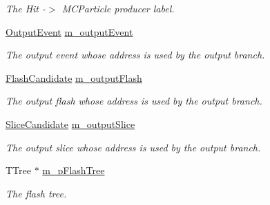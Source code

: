 \begin{DoxyCompactItemize}
\begin{DoxyCompactList}\small\item\em The Hit -\/$>$ M\+C\+Particle producer label. \end{DoxyCompactList}\item 
\hyperlink{classflashmatch_1_1FlashMatchingTool_1_1OutputEvent}{Output\+Event} \hyperlink{classflashmatch_1_1FlashMatchingTool_a17f8d293d8a8a47a3a18782c1975cca5}{m\+\_\+output\+Event}\hypertarget{classflashmatch_1_1FlashMatchingTool_a17f8d293d8a8a47a3a18782c1975cca5}{}\label{classflashmatch_1_1FlashMatchingTool_a17f8d293d8a8a47a3a18782c1975cca5}

\begin{DoxyCompactList}\small\item\em The output event whose address is used by the output branch. \end{DoxyCompactList}\item 
\hyperlink{classflashmatch_1_1FlashMatchingTool_1_1FlashCandidate}{Flash\+Candidate} \hyperlink{classflashmatch_1_1FlashMatchingTool_a5143114bf5396507981d5beb51cd19ff}{m\+\_\+output\+Flash}\hypertarget{classflashmatch_1_1FlashMatchingTool_a5143114bf5396507981d5beb51cd19ff}{}\label{classflashmatch_1_1FlashMatchingTool_a5143114bf5396507981d5beb51cd19ff}

\begin{DoxyCompactList}\small\item\em The output flash whose address is used by the output branch. \end{DoxyCompactList}\item 
\hyperlink{classflashmatch_1_1FlashMatchingTool_1_1SliceCandidate}{Slice\+Candidate} \hyperlink{classflashmatch_1_1FlashMatchingTool_a1cfed4e60733015c5db55b7683f83fc7}{m\+\_\+output\+Slice}\hypertarget{classflashmatch_1_1FlashMatchingTool_a1cfed4e60733015c5db55b7683f83fc7}{}\label{classflashmatch_1_1FlashMatchingTool_a1cfed4e60733015c5db55b7683f83fc7}

\begin{DoxyCompactList}\small\item\em The output slice whose address is used by the output branch. \end{DoxyCompactList}\item 
T\+Tree $\ast$ \hyperlink{classflashmatch_1_1FlashMatchingTool_a34a8387456b15a105daac14517040d4d}{m\+\_\+p\+Flash\+Tree}\hypertarget{classflashmatch_1_1FlashMatchingTool_a34a8387456b15a105daac14517040d4d}{}\label{classflashmatch_1_1FlashMatchingTool_a34a8387456b15a105daac14517040d4d}

\begin{DoxyCompactList}\small\item\em The flash tree. \end{DoxyCompactList}\end{DoxyCompactItemize}


